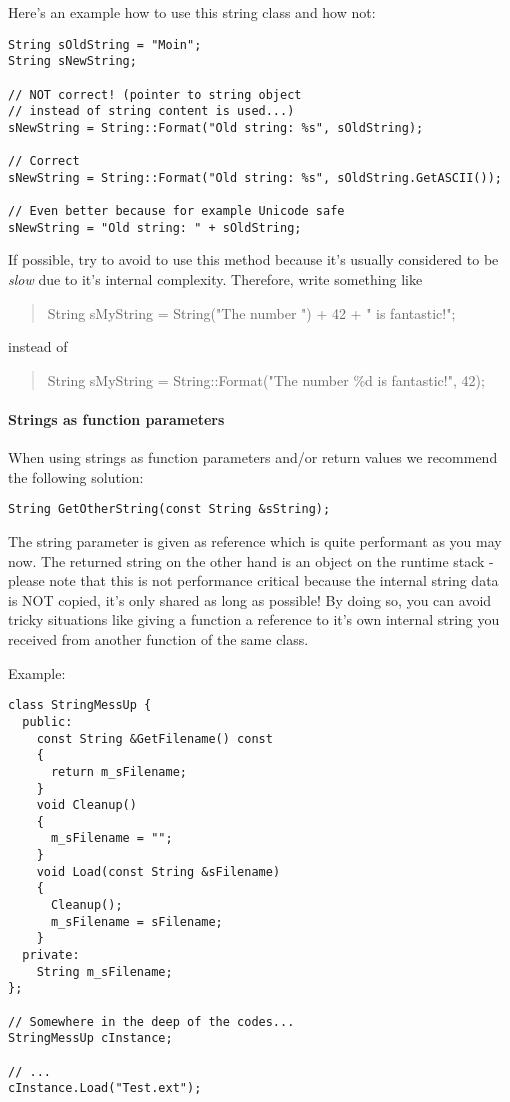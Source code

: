 Here's an example how to use this string class and how not:

\begin{lstlisting}[caption=Valid and invalid string usage example]
String sOldString = "Moin";
String sNewString;

// NOT correct! (pointer to string object
// instead of string content is used...)
sNewString = String::Format("Old string: %s", sOldString);

// Correct
sNewString = String::Format("Old string: %s", sOldString.GetASCII());

// Even better because for example Unicode safe
sNewString = "Old string: " + sOldString;
\end{lstlisting}

If possible, try to avoid to use this method because it's usually considered to be \emph{slow} due to it's internal complexity. Therefore, write something like
\begin{quote}String sMyString = String("The number ") + 42 + " is fantastic!";\end{quote} instead of \begin{quote}String sMyString = String::Format("The number \%d is fantastic!", 42);\end{quote}


\paragraph{Strings as function parameters}
When using strings as function parameters and/or return values we recommend the following solution:

\begin{lstlisting}[caption=String as function parameter and return value]
String GetOtherString(const String &sString);
\end{lstlisting}

The string parameter is given as reference which is quite performant as you may now. The returned string on the other hand is an object on the runtime stack - please note that this is not performance critical because the internal string data is NOT copied, it's only shared as long as possible! By doing so, you can avoid tricky situations like giving a function a reference to it's own internal string you received from another function of the same class.

Example:

\begin{lstlisting}[caption=Error prone string usage example]
class StringMessUp {
  public:
    const String &GetFilename() const
    {
      return m_sFilename;
    }
    void Cleanup()
    {
      m_sFilename = "";
    }
    void Load(const String &sFilename)
    {
      Cleanup();
      m_sFilename = sFilename;
    }
  private:
    String m_sFilename;
};

// Somewhere in the deep of the codes...
StringMessUp cInstance;

// ...
cInstance.Load("Test.ext");
\end{lstlisting}

